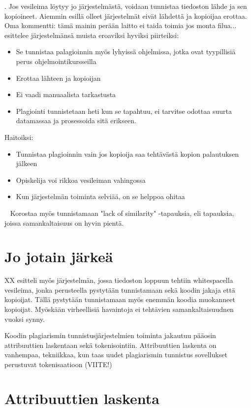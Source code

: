 \documentclass[finnish]{../tktltiki2}
\theoremstyle{definition}
\theoremstyle{remark}
\begin{document}
 . Jos vesileima löytyy jo järjestelmästä, voidaan tunnistaa tiedoston lähde ja sen kopioineet. Aiemmin esillä olleet järjestelmät eivät lähdettä ja kopioijaa erottaa.
Oma kommentti: tämä mainin perään laitto ei taida toimia jos monta filua...
~\cite{Daly:2005:PP:1047124.1047473} esittelee järjestelmänsä muista eroaviksi hyviksi piirteiksi:
\begin{itemize}
\item Se tunnistaa palagioinnin myös lyhyissä ohjelmissa, jotka ovat tyypillisiä perus ohjelmointikursseilla
\item Erottaa lähteen ja kopioijan
\item Ei vaadi manuaalista tarkastusta
\item Plagiointi tunnistetaan heti kun se tapahtuu, ei tarvitse odottaa suurta datamassaa ja prosessoida sitä erikseen.
\end{itemize}


Haitoiksi:
\begin{itemize}
\item Tunnistaa plagioinnin vain jos kopioija saa tehtävästä kopion palautuksen jälkeen
\item Opiskelija voi rikkoa vesileiman vahingossa
\item Kun järjestelmän toiminta selviää, on se helppoa ohitaa
\end{itemize}

 ~\cite{Mann:2006:SOC:1151869.1151888} Korostaa myös tunnistamaan "lack of similarity" -tapauksia, eli tapauksia, joissa samankaltaisuus on hyvin pientä.


\section{Jo jotain järkeä}
XX esitteli myös järjestelmän, jossa tiedoston loppuun tehtiin whitespacella vesileima, jonka perusteella pystytään tunnistamaan sekä koodin jakaja että kopioijat. Tällä pystytään tunnistamaan myös enemmän koodia muokanneet kopioijat. Myöskään virheellisiä havaintoja ei tehtävien samankaltaisuudnen vuoksi synny.


Koodin plagiarismin tunnistusjärjestelmien toiminta jakautuu pääosin attribuuttien laskentaan sekä tokenisointiin.
Attribuuttien laskenta on vanhempaa, tekniikkaa, kun taas uudet plagiarismin tunnistus sovellukset perustuvat tokenisaatioon (VIITE!)



\section{Attribuuttien laskenta}
\end{document}
